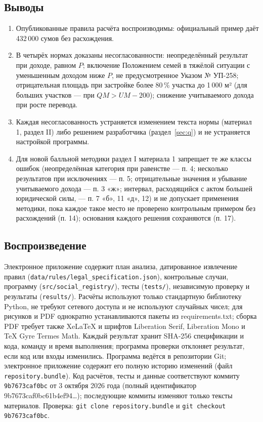 \documentclass[14pt,a4paper]{extarticle}
\begin{document}
\subsection{Выводы}
\begin{enumerate}[leftmargin=1.27cm]
\item Опубликованные правила расчёта воспроизводимы: официальный пример даёт 432\,000 сумов без расхождения.
\item В четырёх нормах доказаны несогласованности: неопределённый результат при доходе, равном $P$; включение Положением семей в тяжёлой ситуации с уменьшенным доходом ниже $P$, не предусмотренное Указом № УП-258; отрицательная площадь при застройке более 80\,\% участка до 1\,000 м² (для больших участков — при $QM>UM-200$); снижение учитываемого дохода при росте перевода.
\item Каждая несогласованность устраняется изменением текста нормы (материал 1, раздел II) либо решением разработчика (раздел~\ref{sec:q}) и не устраняется настройкой программы.
\item Для новой балльной методики раздел I материала 1 запрещает те же классы ошибок (неопределённая категория при равенстве — п. 4; несколько результатов при исключениях — п. 5; отрицательные значения и убывание учитываемого дохода — п. 3 «ж»; интервал, расходящийся с актом большей юридической силы, — п. 7 «б», 11 «д», 12) и не допускает применения методики, пока каждое такое место не проверено контрольным примером без расхождений (п. 14); основания каждого решения сохраняются (п. 17).
\end{enumerate}

\subsection{Воспроизведение}
Электронное приложение содержит план анализа, датированное извлечение правил (\nolinkurl{data/rules/legal_specification.json}), контрольные случаи, программу (\nolinkurl{src/social_registry/}), тесты (\nolinkurl{tests/}), независимую проверку и результаты (\nolinkurl{results/}). Расчёты используют только стандартную библиотеку Python, не требуют сетевого доступа и не используют случайных чисел; для рисунков и PDF однократно устанавливаются пакеты из requirements.txt; сборка PDF требует также XeLaTeX и шрифтов Liberation Serif, Liberation Mono и TeX Gyre Termes Math. Каждый результат хранит SHA-256 спецификации и кода, команду и время выполнения; программа проверки отклоняет результат, если код или входы изменились. Программа ведётся в репозитории Git; электронное приложение содержит его полную историю изменений (файл \nolinkurl{repository.bundle}). Код расчётов, тесты и данные соответствуют коммиту \nolinkurl{9b7673caf0bc} от 3 октября 2026 года (полный идентификатор 9b7673caf0bc61b4ef94\ldots); последующие коммиты изменяют только тексты материалов. Проверка: \nolinkurl{git clone repository.bundle} и \nolinkurl{git checkout 9b7673caf0bc}.
\end{document}
